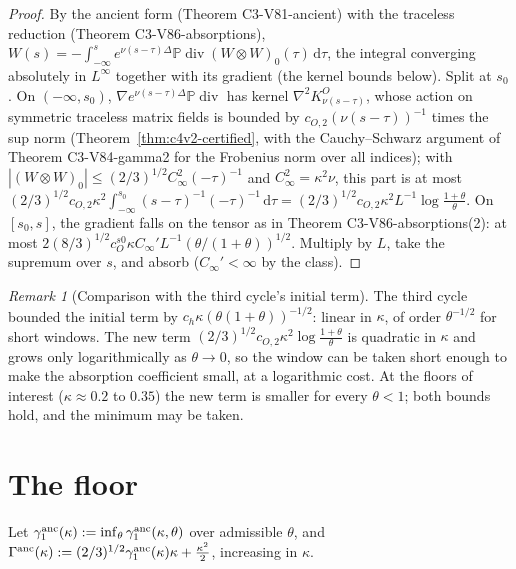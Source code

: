 \documentclass[11pt]{article}
\newcommand{\dd}{\,\mathrm d}
\newcommand{\PP}{\mathbb P}
\theoremstyle{plain}
\theoremstyle{definition}
\theoremstyle{remark}
\newtheorem{remark}[theorem]{Remark}
\begin{document}
\begin{proof}
By the ancient form (Theorem C3-V81-ancient) with the traceless
reduction (Theorem C3-V86-absorptions),
\(W(s)=-\int_{-\infty}^se^{\nu(s-\tau)\Delta}\PP\operatorname{div}(W\otimes W)_0(\tau)\dd\tau\), the integral converging
absolutely in \(L^\infty\) together with its gradient (the kernel bounds
below).  Split at \(s_0\).  On \((-\infty,s_0)\), \(\nabla e^{\nu(s-\tau)\Delta}\PP\operatorname{div}\) has kernel
\(\nabla^2K^O_{\nu(s-\tau)}\), whose action on symmetric traceless matrix fields is
bounded by \(c_{O,2}(\nu(s-\tau))^{-1}\) times the sup norm (Theorem~\ref{thm:c4v2-certified},
with the Cauchy--Schwarz argument of Theorem C3-V84-gamma2 for the
Frobenius norm over all indices); with \(|(W\otimes W)_0|\le(2/3)^{1/2}C_\infty^2(-\tau)^{-1}\)
and \(C_\infty^2=\kappa^2\nu\), this part is at most
\((2/3)^{1/2}c_{O,2}\kappa^2\int_{-\infty}^{s_0}(s-\tau)^{-1}(-\tau)^{-1}\dd\tau=(2/3)^{1/2}c_{O,2}\kappa^2L^{-1}\log\frac{1+\theta}\theta\).
On \([s_0,s]\), the gradient falls on the tensor as in Theorem
C3-V86-absorptions(2): at most \(2(8/3)^{1/2}c_O^{s0}\kappa C_\infty'L^{-1}(\theta/(1+\theta))^{1/2}\).
Multiply by \(L\), take the supremum over \(s\), and absorb (\(C_\infty'<\infty\) by the
class).
\end{proof}

\begin{remark}[Comparison with the third cycle's initial term]
\label{rem:c4v3-comparison}
The third cycle bounded the initial term by \(c_h\kappa(\theta(1+\theta))^{-1/2}\): linear
in \(\kappa\), of order \(\theta^{-1/2}\) for short windows.  The new term
\((2/3)^{1/2}c_{O,2}\kappa^2\log\frac{1+\theta}\theta\) is quadratic in \(\kappa\) and grows only
logarithmically as \(\theta\to0\), so the window can be taken short enough
to make the absorption coefficient small, at a logarithmic cost.
At the floors of interest (\(\kappa\approx0.2\) to \(0.35\)) the new term is smaller
for every \(\theta<1\); both bounds hold, and the minimum may be taken.
\end{remark}

\section{The floor}
\label{sec:c4v3-floor}

Let \(\gamma_1^{\rm anc}(\kappa):=\inf_\theta\gamma_1^{\rm anc}(\kappa,\theta)\) over admissible \(\theta\), and
\(\Gamma^{\rm anc}(\kappa):=(2/3)^{1/2}\gamma_1^{\rm anc}(\kappa)\kappa+\frac{\kappa^2}2\), increasing in \(\kappa\).
\end{document}
